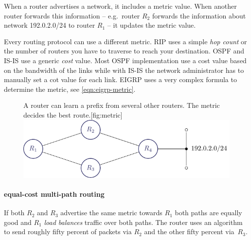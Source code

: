 When a router advertises a network, it includes a metric value.
When another router forwards this information -- e.g.~router $R_2$ forwards the information about network 192.0.2.0/24 to router $R_1$ -- it updates the metric value.

Every routing protocol can use a different metric.
\acs{RIP} uses a simple \emph{hop count} or the number of routers you have to traverse to reach your destination.
\acs{OSPF} and \acs{IS-IS} use a generic \emph{cost} value.
Most \acs{OSPF} implementation use a cost value based on the bandwidth of the links while with \acs{IS-IS} the network administrator has to manually set a cot value for each link.
\acs{EIGRP} uses a very complex formula to determine the metric, see \vref{eqn:eigrp-metric}.

\begin{figure}
\begin{sidecaption}{A router can learn a prefix from several other routers. The metric decides the best route.}[fig:metric]
\centering
\includegraphics[width=\textwidth]{images/ip/metric.pdf}
\end{sidecaption}
\end{figure}


\paragraph{equal-cost multi-path routing}
If both $R_2$ and $R_3$ advertise the same metric towards $R_1$ both paths are equally good and $R_1$ \emph{load balances} traffic over both paths.
The router uses an algorithm to send roughly fifty percent of packets via $R_2$ and the other fifty percent via~$R_3$.

